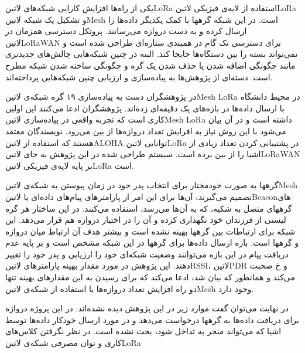 
یکی از راه‌ها افزایش کارایی شبکه‌های ‌لاتین{LoRa} استفاده از لایه‌ی فیزیکی ‌لاتین{LoRa} و تشکیل یک شبکه ‌لاتین{Mesh} است. در این شبکه گرهها با کمک یکدیگر داده‌ها را ارسال کرده و به دست دروازه می‌رسانند.
پروتکل دسترسی همزمان در ‌لاتین{LoRaWAN} برای دسترسی تک گام در همبندی ستاره‌ای طراحی شده است و نمی‌تواند بسته را بین دستگاه‌ها جابجا کند.
البته در چنین شبکه‌هایی چالش‌های جدیدتری مانند چگونگی اضافه شدن یا حذف شدن یک گره و چگونگی ساخته شدن شبکه مطرح است.
دسته‌ای از پژوهش‌ها به پیاده‌سازی و ارزیابی چنین شبکه‌هایی پرداخته‌اند.


در  پژوهشگران دست به پیاده‌سازی ۱۹ گره شبکه‌ی ‌لاتین{Mesh LoRa} در محیط دانشگاه با ارسال داده‌ها در بازه‌های یک دقیقه‌ای زده‌اند.
پژوهشگران ادعا می‌کنند این اولین کاری است که تجربه واقعی در پیاده‌سازی ‌لاتین{Mesh LoRa} داشته است و در آن بیان می‌شود با این روش نیاز به افرایش تعداد دروازه‌ها از بین می‌رود.
نویسندگان معتقد هستند که استفاده از ‌لاتین{ALOHA} توانایی ‌لاتین{LoRa} در پشتیبانی کردن تعداد زیادی از اشیا را از بین برده است.
سیستم طراحی شده در این پژوهش به جای ‌لاتین{LoRaWAN} بر پایه لایه‌ی فیزیکی ‌لاتین{LoRa} است.

گرهها به صورت خودمختار برای انتخاب پدر خود در زمان پیوستن به شبکه‌ی ‌لاتین{Mesh} تصمیم می‌گیرند، آن‌ها برای این امر از پارامترهای پیام‌های داده‌ای یا ‌لاتین{Beacon}های گرههای متصل به شکبه، که به آن‌ها می‌رسد، استفاده می‌کنند.
در این ساختار هر گره لیستی از فرزندان خود نگهداری کرده و آن را در اختیار دروازه هم قرار می‌دهد.
این شبکه برای ارتباطات بین گرهها بهینه نشده است و بیشتر هدف آن ارتباط میان دروازه و گرهها است.
بازه ارسال داده‌ها برای گرهها در این شبکه مشخص است و بر پایه عدم دریافت پیام در این بازه می‌توانند وضعیت شبکه‌ای خود را ارزیابی و پدر خود را تغییر دهند.
این پژوهش در مورد مقدار بهینه پارامترهای ‌لاتین{RSSI}، ‌لاتین{PDR} و ‌خ صحبت می‌کند و همانطور که بیان شد، ادعا می‌کند که برای رسیدن به این مقدارهای بهینه تنها دو راه افزایش تعداد دروازه‌ها یا استفاده از شبکه‌ی ‌لاتین{Mesh} وجود دارد.

در نهایت می‌توان گفت موارد زیر در این پژوهش دیده نشده‌اند:
 در این پروژه دروازه برای دریافت داده‌ها به گرهها درخواست می‌دهد و در مورد ارسال خودکار داده‌ها توسط اشیا که می‌تواند منجر به تداخل شود، بحث نشده است.
 در نظر نگرفتن کلاس‌های کاری و توان مصرفی شبکه‌ی ‌لاتین{LoRa}



